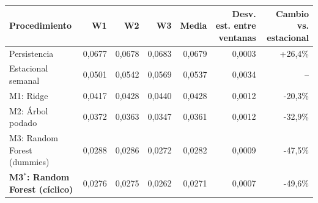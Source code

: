 \begin{tabular}{lrrrrrr}
\toprule
Procedimiento & W1 & W2 & W3 & Media & Desv. est. entre ventanas & Cambio vs. estacional \\
\midrule
Persistencia & 0{,}0677 & 0{,}0678 & 0{,}0683 & 0{,}0679 & 0{,}0003 & +26{,}4\% \\
Estacional semanal & 0{,}0501 & 0{,}0542 & 0{,}0569 & 0{,}0537 & 0{,}0034 & -- \\
\midrule
M1: Ridge & 0{,}0417 & 0{,}0428 & 0{,}0440 & 0{,}0428 & 0{,}0012 & -20{,}3\% \\
M2: Árbol podado & 0{,}0372 & 0{,}0363 & 0{,}0347 & 0{,}0361 & 0{,}0012 & -32{,}9\% \\
M3: Random Forest (dummies) & 0{,}0288 & 0{,}0286 & 0{,}0272 & 0{,}0282 & 0{,}0009 & -47{,}5\% \\
\textbf{M3$^\ast$: Random Forest (cíclico)} & 0{,}0276 & 0{,}0275 & 0{,}0262 & 0{,}0271 & 0{,}0007 & -49{,}6\% \\
\bottomrule
\end{tabular}